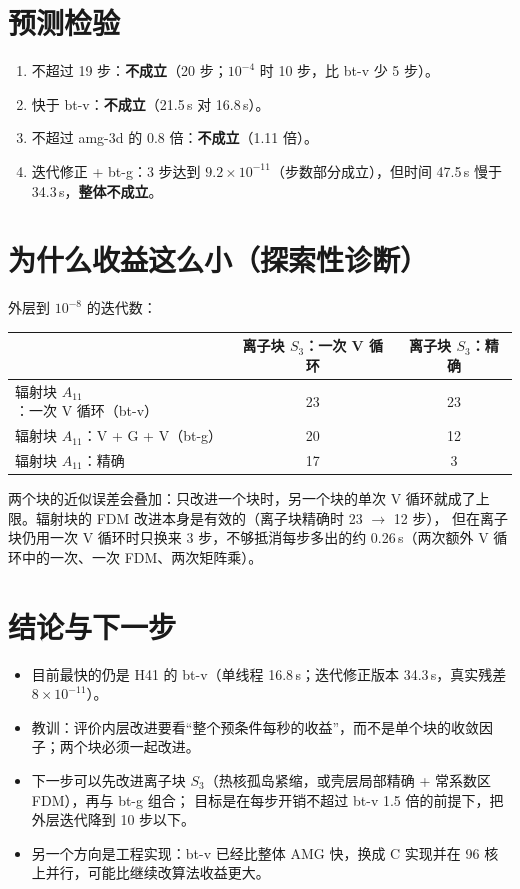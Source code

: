 \documentclass[11pt,a4paper]{ctexart}
\begin{document}
\section{预测检验}
\begin{enumerate}
\item 不超过 19 步：\textbf{不成立}（20 步；$10^{-4}$ 时 10 步，比 bt-v 少 5 步）。
\item 快于 bt-v：\textbf{不成立}（21.5\,s 对 16.8\,s）。
\item 不超过 amg-3d 的 0.8 倍：\textbf{不成立}（1.11 倍）。
\item 迭代修正 + bt-g：3 步达到 $9.2\times10^{-11}$（步数部分成立），但时间 47.5\,s 慢于 34.3\,s，\textbf{整体不成立}。
\end{enumerate}

\section{为什么收益这么小（探索性诊断）}
外层到 $10^{-8}$ 的迭代数：
\begin{table}[H]
\centering
\small
\begin{tabular}{lcc}
\toprule
 & 离子块 $S_3$：一次 V 循环 & 离子块 $S_3$：精确 \\
\midrule
辐射块 $A_{11}$：一次 V 循环（bt-v） & 23 & 23 \\
辐射块 $A_{11}$：V + G + V（bt-g） & 20 & 12 \\
辐射块 $A_{11}$：精确 & 17 & 3 \\
\bottomrule
\end{tabular}
\end{table}
两个块的近似误差会叠加：只改进一个块时，另一个块的单次 V 循环就成了上限。辐射块的 FDM 改进本身是有效的（离子块精确时 23 $\to$ 12 步），
但在离子块仍用一次 V 循环时只换来 3 步，不够抵消每步多出的约 0.26\,s（两次额外 V 循环中的一次、一次 FDM、两次矩阵乘）。

\section{结论与下一步}
\begin{itemize}
\item 目前最快的仍是 H41 的 bt-v（单线程 16.8\,s；迭代修正版本 34.3\,s，真实残差 $8\times10^{-11}$）。
\item 教训：评价内层改进要看“整个预条件每秒的收益”，而不是单个块的收敛因子；两个块必须一起改进。
\item 下一步可以先改进离子块 $S_3$（热核孤岛紧缩，或壳层局部精确 + 常系数区 FDM），再与 bt-g 组合；
目标是在每步开销不超过 bt-v 1.5 倍的前提下，把外层迭代降到 10 步以下。
\item 另一个方向是工程实现：bt-v 已经比整体 AMG 快，换成 C 实现并在 96 核上并行，可能比继续改算法收益更大。
\end{itemize}
\end{document}
